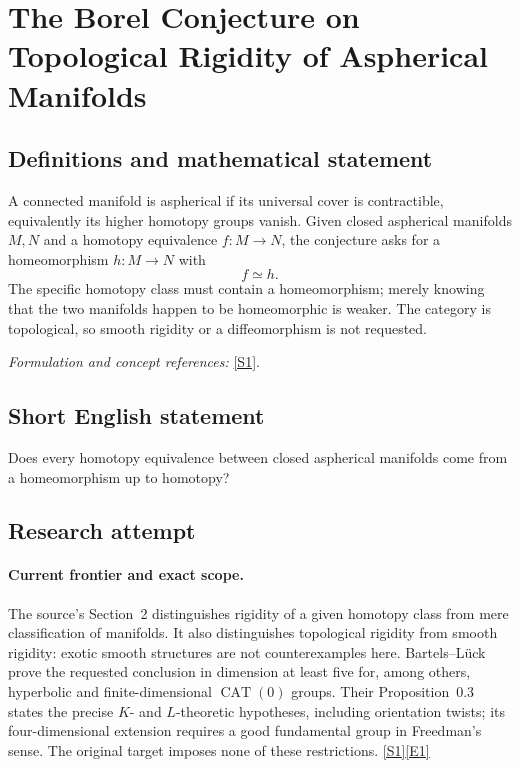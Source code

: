 \documentclass[11pt,a4paper]{article}
\newcommand{\sref}[2]{\hyperlink{source:#1:#2}{[S#2]}}
\newcommand{\eref}[2]{\hyperlink{extra:#1:#2}{[E#2]}}
\newif\ifshowcatalogue
\newcommand{\cataloguescope}[1]{\ifshowcatalogue
 \paragraph{Exact scope in the supplied catalogue.}
 \begin{quote}\small #1\end{quote}\fi}
\numberwithin{equation}{section}
\begin{document}
\setcounter{section}{0}
\clearpage
\section*{\texorpdfstring{The Borel Conjecture on Topological Rigidity of Aspherical Manifolds}{The Borel Conjecture on Topological Rigidity of Aspherical Manifolds}}\label{statement}
\subsection{Definitions and mathematical statement}
A connected manifold is aspherical if its universal cover is contractible, equivalently its higher homotopy groups vanish. Given closed aspherical manifolds $M,N$ and a homotopy equivalence $f:M\to N$, the conjecture asks for a homeomorphism $h:M\to N$ with
\[
 f\simeq h.
\]
The specific homotopy class must contain a homeomorphism; merely knowing that the two manifolds happen to be homeomorphic is weaker. The category is topological, so smooth rigidity or a diffeomorphism is not requested.
\par\smallskip\textit{Formulation and concept references:} \sref{statement}{1}.
\cataloguescope{Prove that every homotopy equivalence between closed aspherical manifolds is homotopic to a homeomorphism.}
\subsection{Short English statement}
Does every homotopy equivalence between closed aspherical manifolds come from a homeomorphism up to homotopy?
\subsection{Research attempt}

\paragraph{Current frontier and exact scope.}
The source's Section~2 distinguishes rigidity of a given homotopy class
from mere classification of manifolds. It also distinguishes topological
rigidity from smooth rigidity: exotic smooth structures are not
counterexamples here. Bartels--L\"uck prove the requested conclusion in
dimension at least five for, among others, hyperbolic and finite-dimensional
$\operatorname{CAT}(0)$ groups. Their Proposition~0.3 states the precise
$K$- and $L$-theoretic hypotheses, including orientation twists; its
four-dimensional extension requires a good fundamental group in
Freedman's sense. The original target imposes none of these restrictions.
\sref{statement}{1}\eref{statement}{1}
\end{document}
